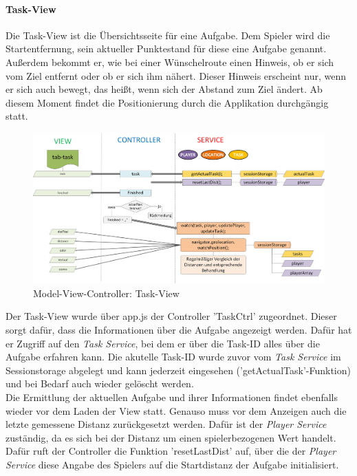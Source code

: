 \paragraph{Task-View}
%
%
Die Task-View ist die Übersichtsseite für eine Aufgabe. Dem Spieler wird die Startentfernung, sein aktueller Punktestand für diese eine Aufgabe genannt. Außerdem bekommt er, wie bei einer Wünschelroute einen Hinweis, ob er sich vom Ziel entfernt oder ob er sich ihm nähert. Dieser Hinweis erscheint nur, wenn er sich auch bewegt, das heißt, wenn sich der Abstand zum Ziel ändert. Ab diesem Moment findet die Positionierung durch die Applikation durchgängig statt.
%
%
\begin{figure}[h]
\centering
\includegraphics[width=1\textwidth]{ref/images/05-task-tab.png}
\caption[Model-View-Controller: Task-View]{Model-View-Controller: Task-View}
\label{fig:MVC:Task-View}
\end{figure}
%
%


Der Task-View wurde über app.js der Controller 'TaskCtrl' zugeordnet. Dieser sorgt dafür, dass die Informationen über die Aufgabe angezeigt werden. Dafür hat er Zugriff auf den \emph{Task Service}, bei dem er über die Task-ID alles über die Aufgabe erfahren kann. Die akutelle Task-ID wurde zuvor vom \emph{Task Service} im Sessionstorage abgelegt und kann jederzeit eingesehen ('getActualTask'-Funktion) und bei Bedarf auch wieder gelöscht werden.
\\
Die Ermittlung der aktuellen Aufgabe und ihrer Informationen findet ebenfalls wieder vor dem Laden der View statt. Genauso muss vor dem Anzeigen auch die letzte gemessene Distanz zurückgesetzt werden. Dafür ist der \emph{Player Service} zuständig, da es sich bei der Distanz um einen spielerbezogenen Wert handelt. Dafür ruft der Controller die Funktion 'resetLastDist' auf, über die der \emph{Player Service} diese Angabe des Spielers auf die Startdistanz der Aufgabe initialisiert.


